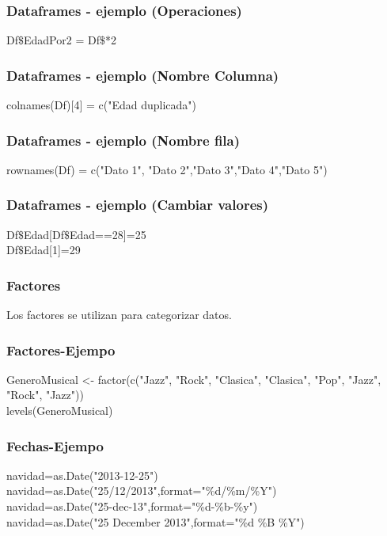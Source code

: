 \documentclass[14pt]{beamer}
\begin{document}
\begin{frame}
	\frametitle{Dataframes - ejemplo (Operaciones)}
	
	Df$\$$EdadPor2 = Df$\$$*2
	
\end{frame}

\begin{frame}
	\frametitle{Dataframes - ejemplo (Nombre Columna)}
	
	colnames(Df)[4] = c("Edad duplicada")
	
\end{frame}

\begin{frame}
	\frametitle{Dataframes - ejemplo (Nombre fila)}
	
	rownames(Df) = c("Dato 1", "Dato 2","Dato 3","Dato 4","Dato 5")
	
\end{frame}

\begin{frame}
	\frametitle{Dataframes - ejemplo (Cambiar valores)}
	
	Df$\$$Edad[Df$\$$Edad==28]=25 \\
	Df$\$$Edad[1]=29
	
\end{frame}

\begin{frame}
	\frametitle{Factores}
	Los factores se utilizan para categorizar datos.
	
\end{frame}

\begin{frame}
	\frametitle{Factores-Ejempo}
	GeneroMusical <- factor(c("Jazz", "Rock", "Clasica", "Clasica", "Pop", "Jazz", "Rock", "Jazz"))\\
	levels(GeneroMusical)
	
\end{frame}

\begin{frame}
	\frametitle{Fechas-Ejempo}
	navidad=as.Date("2013-12-25")\\
	navidad=as.Date("25/12/2013",format="\%d/\%m/\%Y")\\
	navidad=as.Date("25-dec-13",format="\%d-\%b-\%y")\\
	navidad=as.Date("25 December 2013",format="\%d \%B \%Y")
	
\end{frame}
\end{document}
